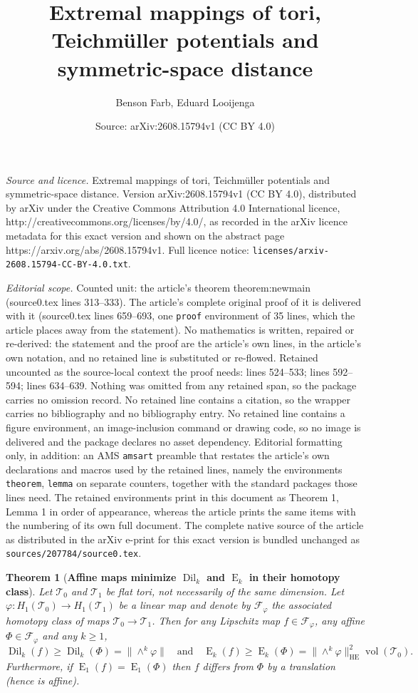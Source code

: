 \documentclass[10pt,a4paper]{amsart}
\title{Extremal mappings of tori, Teichm\"uller potentials and symmetric-space distance}
\author{Benson Farb, Eduard Looijenga}
\date{Source: arXiv:2608.15794v1 (CC BY 4.0)}
\newtheorem{theorem}{Theorem}
\newcommand{\Dil}{\operatorname{Dil}}
\DeclareMathOperator{\En}{E}
\newcommand{\Fc}{\mathcal{F}}
\DeclareMathOperator{\HE}{HE}
\newcommand{\Tc}{\mathcal{T}}
\newcommand{\vol}{\operatorname{vol}}
\begin{document}
\maketitle

\noindent\emph{Source and licence.} Extremal mappings of tori, Teichm\"uller potentials and symmetric-space distance. Version arXiv:2608.15794v1 (CC BY 4.0), distributed by arXiv under the Creative Commons Attribution 4.0 International licence, http://creativecommons.org/licenses/by/4.0/, as recorded in the arXiv licence metadata for this exact version and shown on the abstract page https://arxiv.org/abs/2608.15794v1. Full licence notice: \texttt{licenses/arxiv-2608.15794-CC-BY-4.0.txt}.\par\smallskip

\noindent\textit{Editorial scope.} Counted unit: the article's theorem theorem:newmain (source0.tex lines 313--333). The article's complete original proof of it is delivered with it (source0.tex lines 659--693, one \texttt{proof} environment of 35 lines, which the article places away from the statement). No mathematics is written, repaired or re-derived: the statement and the proof are the article's own lines, in the article's own notation, and no retained line is substituted or re-flowed.  Retained uncounted as the source-local context the proof needs: lines 524--533; lines 592--594; lines 634--639.  Nothing was omitted from any retained span, so the package carries no omission record.  No retained line contains a citation, so the wrapper carries no bibliography and no bibliography entry.  No retained line contains a figure environment, an image-inclusion command or drawing code, so no image is delivered and the package declares no asset dependency.  Editorial formatting only, in addition: an AMS \texttt{amsart} preamble that restates the article's own declarations and macros used by the retained lines, namely the environments \texttt{theorem}, \texttt{lemma} on separate counters, together with the standard packages those lines need.  The retained environments print in this document as Theorem 1, Lemma 1 in order of appearance, whereas the article prints the same items with the numbering of its own full document.  The complete native source of the article as distributed in the arXiv e-print for this exact version is bundled unchanged as \texttt{sources/207784/source0.tex}.
\begin{theorem}[{\bf Affine maps minimize $\Dil_k$ and $\En_k$ in their homotopy class}]
\label{thm:extremal}
Let $\Tc_0$ and $\Tc_1$ be flat  tori, not necessarily of the same dimension.  Let $\varphi: H_1(\Tc_0)\to H_1(\Tc_1)$ be a linear map and denote 
by $\Fc_\varphi$ the associated homotopy class of maps $\Tc_0\to \Tc_1$.
Then for any Lipschitz map 
$f\in \Fc_\varphi$, any affine $\Phi\in \Fc_\varphi$ and any $k\ge 1$, 
\[\Dil_k(f)\geq \Dil_k(\Phi)=\|\wedge^k\varphi\| \quad \text{and}\quad \En_k(f)\ge  \En_k(\Phi)=\|\wedge^k\varphi\|_{\HE}^2\vol(\Tc_0).
\]
Furthermore, if $\En_1(f)= \En_1(\Phi)$ then $f$ differs from $\Phi$ by a translation (hence is affine).
\end{theorem}
\end{document}
